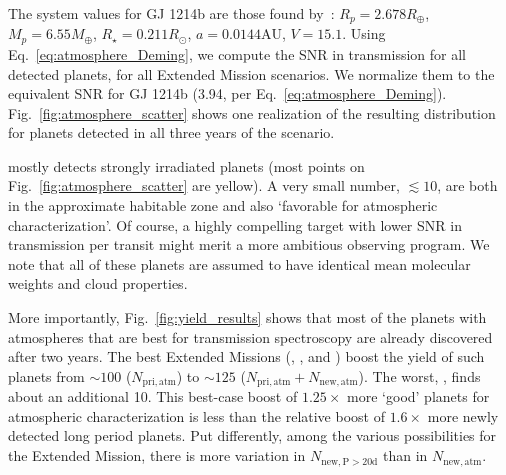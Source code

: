 \begin{enumerate}
	The system values for GJ 1214b are those found
	by~\citet{charbonneau_gj1214b_2009}: $R_p = 2.678R_\oplus$, $M_p = 6.55M_\oplus$,
	$R_\star = 0.211R_\odot$, $a = 0.0144\mathrm{AU}$, $V = 15.1$.
	Using Eq.~\ref{eq:atmosphere_Deming}, we compute the SNR in transmission for 
	all detected planets, for all Extended Mission scenarios.
	We normalize them to the equivalent SNR for GJ 1214b (3.94, per 
	Eq.~\ref{eq:atmosphere_Deming}).
	Fig.~\ref{fig:atmosphere_scatter} shows one realization of the resulting 
	distribution for planets detected in all three years of the \npole\:scenario.

	\tess mostly detects strongly irradiated planets (most points on Fig.~\ref{fig:atmosphere_scatter} are yellow).
	A very small number, $\lesssim 10$, are both in the approximate habitable zone and also `favorable for atmospheric characterization'.
	Of course, a highly compelling target with lower SNR in transmission per transit might merit a more ambitious \jwst observing program.
	We note that all of these planets are assumed to have identical mean molecular weights and cloud properties.

	More importantly, Fig.~\ref{fig:yield_results} shows that most of the planets with atmospheres that are best for transmission spectroscopy are already discovered after two years.
	The best Extended Missions (\shemiAvoid, \elong, \eshort\:and \hemis) boost 
	the yield of such planets from $\sim\!100$ ($N_\mathrm{pri,atm}$) to 
	$\sim\!125$ ($N_\mathrm{pri,atm} + N_\mathrm{new,atm}$).
	The worst, \npole, finds about an additional 10.
	This best-case boost of $1.25\times$ more `good' planets for atmospheric characterization is less than the relative boost of $1.6\times$ more newly detected long period planets.
	Put differently, among the various possibilities for the Extended Mission,
        there is more variation in $N_\mathrm{new,P>20d}$ than in 
        $N_\mathrm{new,atm}$.
	

\end{enumerate}
